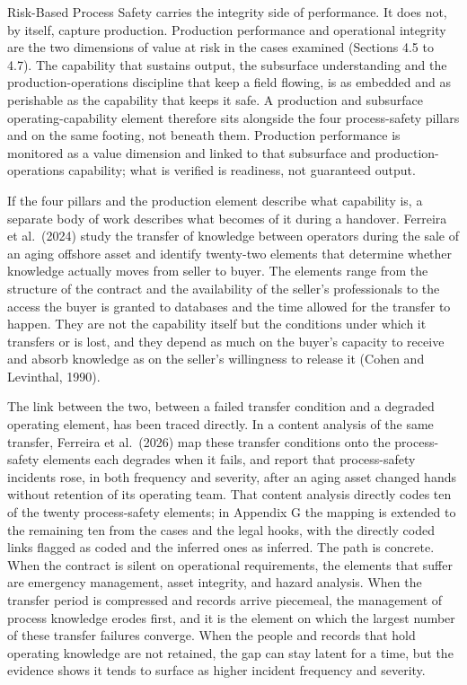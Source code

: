 Risk-Based Process Safety carries the integrity side of performance. It
does not, by itself, capture production. Production performance and
operational integrity are the two dimensions of value at risk in the
cases examined (Sections 4.5 to 4.7). The capability that sustains
output, the subsurface understanding and the production-operations
discipline that keep a field flowing, is as embedded and as perishable
as the capability that keeps it safe. A production and subsurface
operating-capability element therefore sits alongside the four
process-safety pillars and on the same footing, not beneath them.
Production performance is monitored as a value dimension and linked to
that subsurface and production-operations capability; what is verified
is readiness, not guaranteed output.

If the four pillars and the production element describe what capability
is, a separate body of work describes what becomes of it during a
handover. Ferreira et al.~(2024) study the transfer of knowledge between
operators during the sale of an aging offshore asset and identify
twenty-two elements that determine whether knowledge actually moves from
seller to buyer. The elements range from the structure of the contract
and the availability of the seller's professionals to the access the
buyer is granted to databases and the time allowed for the transfer to
happen. They are not the capability itself but the conditions under
which it transfers or is lost, and they depend as much on the buyer's
capacity to receive and absorb knowledge as on the seller's willingness
to release it (Cohen and Levinthal, 1990).

The link between the two, between a failed transfer condition and a
degraded operating element, has been traced directly. In a content
analysis of the same transfer, Ferreira et al.~(2026) map these transfer
conditions onto the process-safety elements each degrades when it fails,
and report that process-safety incidents rose, in both frequency and
severity, after an aging asset changed hands without retention of its
operating team. That content analysis directly codes ten of the twenty
process-safety elements; in Appendix G the mapping is extended to the
remaining ten from the cases and the legal hooks, with the directly
coded links flagged as coded and the inferred ones as inferred. The path
is concrete. When the contract is silent on operational requirements,
the elements that suffer are emergency management, asset integrity, and
hazard analysis. When the transfer period is compressed and records
arrive piecemeal, the management of process knowledge erodes first, and
it is the element on which the largest number of these transfer failures
converge. When the people and records that hold operating knowledge are
not retained, the gap can stay latent for a time, but the evidence shows
it tends to surface as higher incident frequency and severity.

